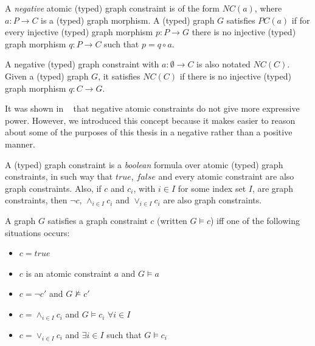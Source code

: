 \begin{definition}
A \emph{negative} atomic (typed) graph constraint is of the form $NC\left(a\right)$, where $a : P \rightarrow C$ is a (typed) graph morphism. A (typed) graph $G$ satisfies $PC\left(a\right)$ if for every injective (typed) graph morphism $p : P \rightarrow G$ there is no injective (typed) graph morphism $q : P \rightarrow C$ such that $p = q \circ a$.

  A negative (typed) graph constraint with $a : \emptyset \rightarrow C$ is also notated $NC\left(C\right)$. Given a (typed) graph $G$, it satisfies $NC\left(C\right)$ if there is no injective (typed) graph morphism $q : C \rightarrow G$.


\end{definition}

\begin{remark} It was shown in ~\cite{Ehrig2006} that negative atomic constraints do not give more expressive power. However, we introduced this concept because it makes easier to reason about some of the purposes of this thesis in a negative rather than a positive manner.%
\end{remark}

\begin{definition} A (typed) graph constraint is a \emph{boolean} formula over atomic (typed) graph constraints, in such way that $true$, $false$ and every atomic constraint are also graph constraints. Also, if $c$ and $c_i$, with $i \in I$ for some index set $I$, are graph constraints, then $\neg c$, $\land_{i \in I} c_i$ and $\lor_{i \in I} c_i$ are also graph constraints.

  A graph $G$ satisfies a graph constraint $c$ (written $G \models c$) iff one of the following situations occurs:
  \begin{itemize}
    \item $c = true$
    \item $c$ is an atomic constraint $a$ and $G \models a$
    \item $c = \neg c'$ and $G \not\models c'$
    \item $c = \land_{i \in I}c_i$ and $G \models c_i$ $\forall i \in I$ 
    \item $c = \lor_{i \in I}c_i$  and $\exists i \in I$ such that $G \models c_i$
  \end{itemize}
\end{definition}

